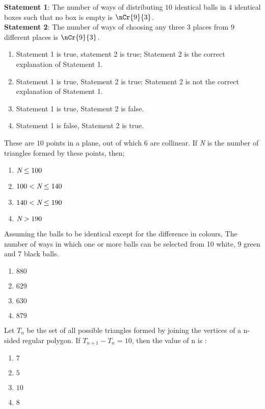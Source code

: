 \item \textbf{Statement 1}: The number of ways of distributing $10$ identical balls in $4$ identical boxes such that no box is empty is $\nCr{9}{3}$.\\\textbf{Statement 2}: The number of ways of choosing any three $3$ places from $9$ different places is $\nCr{9}{3}$. \hfill{}
 \begin{enumerate}
     \item Statement 1 is true, statement 2 is true; Statement 2 is the correct explanation of Statement 1.
     \item Statement 1 is true, Statement 2 is true; Statement 2 is not the correct explanation of Statement 1.
     \item Statement 1 is true, Statement 2 is false.
     \item Statement 1 is false, Statement 2 is true.
 \end{enumerate}
\item These are $10$ points in a plane, out of which 6 are collinear. If \emph{N} is the number of triangles formed by these points, then; \hfill{}
	\begin{multicols}{2}
	\begin{enumerate}
		\item $ \emph{N} \le100$
		\item $100< \emph{N} \le140$
		\item $140< \emph{N} \le190$
		\item $ \emph{N} >190$
        \end{enumerate}
	\end{multicols}
\item Assuming the balls to be identical except for the difference in colours, The number of ways in which one or more balls can be selected from 10 white, 9 green and 7 black balls. \hfill {}
	\begin{multicols}{4}
	\begin{enumerate}
     \item $880$
     \item $629$
     \item $630$
     \item $879$
        \end{enumerate}
	\end{multicols}
\item Let $T_n$ be the set of all possible triangles formed by joining the vertices of a n-sided regular polygon. If $T_{n+1} - T_n = 10$, then the value of n is : \hfill {}
	\begin{multicols}{4}
	\begin{enumerate}
     \item $7$
     \item $5$
     \item $10$
     \item $8$
        \end{enumerate}
	\end{multicols}
